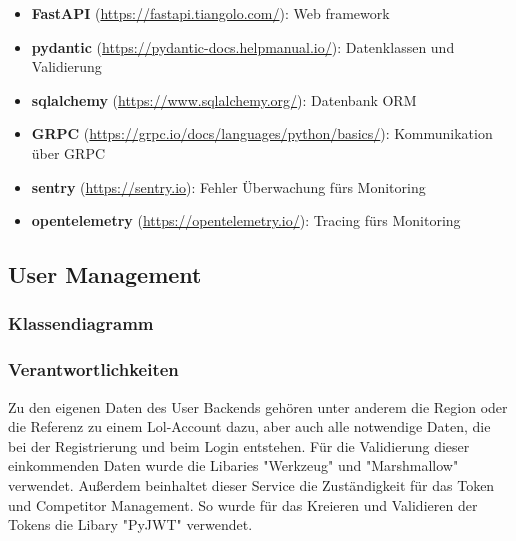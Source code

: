 \begin{itemize}
    \item \textbf{FastAPI} (\href{https://fastapi.tiangolo.com/}{https://fastapi.tiangolo.com/}): Web framework
    \item \textbf{pydantic} (\href{https://pydantic-docs.helpmanual.io/}{https://pydantic-docs.helpmanual.io/}): Datenklassen und Validierung
    \item \textbf{sqlalchemy} (\href{https://www.sqlalchemy.org/}{https://www.sqlalchemy.org/}): Datenbank ORM
    \item \textbf{GRPC} (\href{https://grpc.io/docs/languages/python/basics/}{https://grpc.io/docs/languages/python/basics/}): Kommunikation über GRPC
    \item \textbf{sentry} (\href{https://sentry.io}{https://sentry.io}): Fehler Überwachung fürs Monitoring
    \item \textbf{opentelemetry} (\href{https://opentelemetry.io/}{https://opentelemetry.io/}): Tracing fürs Monitoring
\end{itemize}

\subsection{User Management}
\subsubsection{Klassendiagramm}
\subsubsection{Verantwortlichkeiten}
Zu den eigenen Daten des User Backends gehören unter anderem die Region oder die Referenz zu einem Lol-Account dazu, 
aber auch alle notwendige Daten, die bei der Registrierung und beim Login entstehen. Für die Validierung dieser einkommenden Daten wurde die Libaries "Werkzeug" und "Marshmallow" verwendet.
Außerdem beinhaltet dieser Service die Zuständigkeit für das Token und Competitor Management. So wurde für das Kreieren und Validieren der Tokens die Libary
"PyJWT" verwendet.
